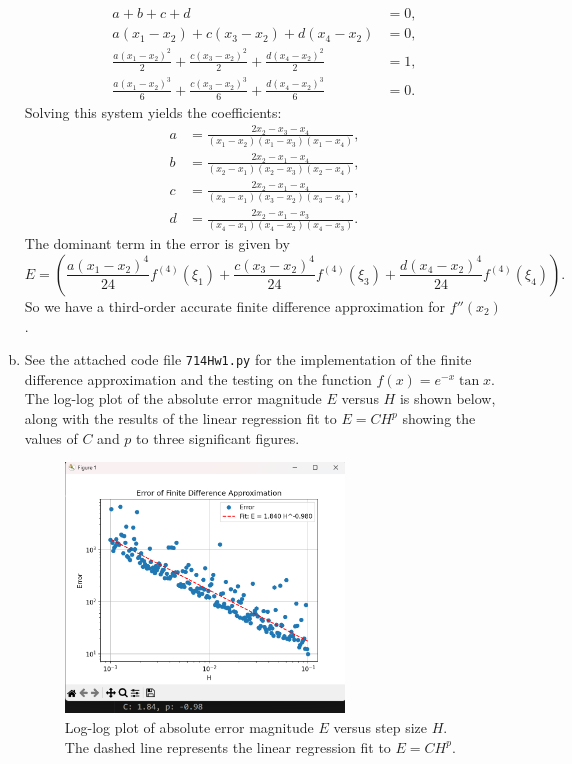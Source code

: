 \documentclass{article}
\begin{document}
\begin{enumerate}[(a)]
\begin{align}
          a + b + c + d & = 0, \\
          a(x_1 - x_2) + c(x_3 - x_2) + d(x_4 - x_2) & = 0, \\
          \frac{a(x_1 - x_2)^2}{2} + \frac{c(x_3 - x_2)^2}{2} + \frac{d(x_4 - x_2)^2}{2} & = 1, \\
          \frac{a(x_1 - x_2)^3}{6} + \frac{c(x_3 - x_2)^3}{6} + \frac{d(x_4 - x_2)^3}{6} & = 0.
        \end{align}
        Solving this system yields the coefficients:
        \begin{align*}
          a & = \frac{2x_2 - x_3 - x_4}{(x_1 - x_2)(x_1 - x_3)(x_1 - x_4)}, \\
          b & = \frac{2x_2 - x_1 - x_4}{(x_2 - x_1)(x_2 - x_3)(x_2 - x_4)}, \\
          c & = \frac{2x_2 - x_1 - x_4}{(x_3 - x_1)(x_3 - x_2)(x_3 - x_4)}, \\
          d & = \frac{2x_2 - x_1 - x_3}{(x_4 - x_1)(x_4 - x_2)(x_4 - x_3)}.
        \end{align*}
        The dominant term in the error is given by
        \begin{equation}
          E = \left(\frac{a(x_1-x_2)^4}{24}f^{(4)}(\xi_1) + \frac{c(x_3-x_2)^4}{24}f^{(4)}(\xi_3) + \frac{d(x_4-x_2)^4}{24}f^{(4)}(\xi_4)\right).
        \end{equation}
        So we have a third-order accurate finite difference approximation for $f''(x_2)$.
  \item See the attached code file \texttt{714Hw1.py} for the implementation of the finite difference approximation and the testing on the function $f(x) = e^{-x} \tan x$. The log-log plot of the absolute error magnitude $E$ versus $H$ is shown below, along with the results of the linear regression fit to $E = C H^p$ showing the values of $C$ and $p$ to three significant figures.
  \begin{figure}[H]
    \centering
    \includegraphics[width=0.7\textwidth]{Q1b.png}
    \caption{Log-log plot of absolute error magnitude $E$ versus step size $H$. The dashed line represents the linear regression fit to $E = C H^p$.}
  \end{figure}
\end{enumerate}
\end{document}
